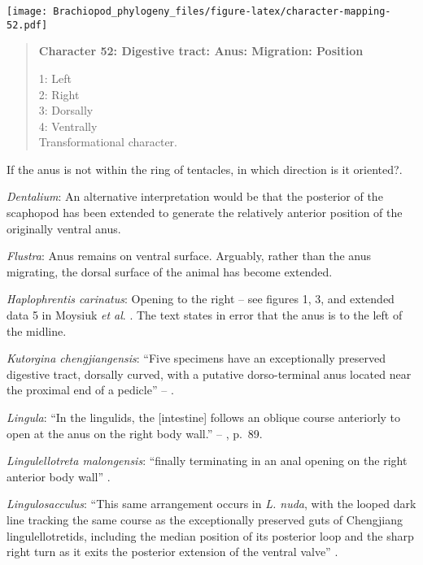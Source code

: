 \documentclass[openany]{book}
\theoremstyle{definition}
\theoremstyle{definition}
\theoremstyle{definition}
\theoremstyle{remark}
\begin{document}
\texttt{[image: Brachiopod\_phylogeny\_files/figure-latex/character-mapping-52.pdf]}

\begin{quote}
\textbf{Character 52: Digestive tract: Anus: Migration: Position}

1: Left\\
2: Right\\
3: Dorsally\\
4: Ventrally\\
Transformational character.
\end{quote}

If the anus is not within the ring of tentacles, in which direction is
it oriented?.

\hypertarget{Dentalium-coding-52}{}
\emph{Dentalium}: An alternative interpretation would be that the
posterior of the scaphopod has been extended to generate the relatively
anterior position of the originally ventral anus.

\hypertarget{Flustra-coding-52}{}
\emph{Flustra}: Anus remains on ventral surface. Arguably, rather than
the anus migrating, the dorsal surface of the animal has become
extended.

\hypertarget{Haplophrentis_carinatus-coding-52}{}
\emph{Haplophrentis carinatus}: Opening to the right -- see figures 1,
3, and extended data 5 in Moysiuk \emph{et al}.
\citeyearpar{Moysiuk2017Hyolithsare}. The text states in error that the
anus is to the left of the midline.

\hypertarget{Kutorgina_chengjiangensis-coding-52}{}
\emph{Kutorgina chengjiangensis}: ``Five specimens have an exceptionally
preserved digestive tract, dorsally curved, with a putative
dorso-terminal anus located near the proximal end of a pedicle'' --
\citet{Zhang2007Rhynchonelliformeanbrachiopods}.

\hypertarget{Lingula-coding-52}{}
\emph{Lingula}: ``In the lingulids, the {[}intestine{]} follows an
oblique course anteriorly to open at the anus on the right body wall.''
-- \citet{Williams1997Introduction}, p.~89.

\hypertarget{Lingulellotreta_malongensis-coding-52}{}
\emph{Lingulellotreta malongensis}: ``finally terminating in an anal
opening on the right anterior body wall'' \citep[p.66]{Zhang2007Noteon}.

\hypertarget{Lingulosacculus-coding-52}{}
\emph{Lingulosacculus}: ``This same arrangement occurs in \emph{L.
nuda}, with the looped dark line tracking the same course as the
exceptionally preserved guts of Chengjiang lingulellotretids, including
the median position of its posterior loop and the sharp right turn as it
exits the posterior extension of the ventral valve''
\citep[p.310]{Balthasar2009EarlyCambrian}.
\end{document}

